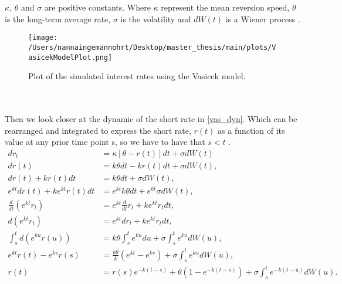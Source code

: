 $\kappa$, $\theta$ and $\sigma$ are positive constants. Where $\kappa$ represent the mean reversion speed, $\theta$ 
is the long-term average rate, $\sigma$ is the volatility  and $dW(t)$ is a Wiener process \cite{Bermudan}. 
\begin{figure}[h]
    \centering
    \texttt{[image: /Users/nannaingemannohrt/Desktop/master\_thesis/main/plots/VasicekModelPlot.png]}
    \caption{Plot of the simulated interest rates using the Vasicek model.}
    \label{fig:vasicek}
\end{figure}
\\\\
\noindent
Then we look closer at the dynamic of the short rate in \autoref{vas_dyn}. Which can be rearranged and integrated
to express the short rate, $r(t)$ as a function of its value at any prior time point s,
so we have to have that $s < t$ \cite{Bermudan}. 
\begin{align}
    d r_t &= \kappa \left[\theta - r(t)\right] dt + \sigma d W(t) \\
    d r(t) &= k \theta dt - k r(t) dt + \sigma d W(t), \\
    d r(t) + k r(t) dt &= k \theta dt + \sigma d W(t), \\
    e^{kt} d r(t) + k e^{kt} r(t) dt &= e^{kt} k \theta dt + e^{kt} \sigma d W(t), \\
    \frac{d}{dt} \left( e^{k t} r_t \right) &= e^{k t} \frac{d}{dt} r_t + k e^{k t} r_t dt, \\
    d\left( e^{k t} r_t \right) &= e^{k t} dr_t + k e^{k t} r_t dt, \\
    \int_s^t d \left( e^{ku} r(u) \right) &= k \theta \int_s^t e^{ku} du + \sigma \int_s^t e^{ku} d W(u), \\
    e^{kt} r(t) - e^{k s} r(s) &= \frac{k \theta}{k} \left( e^{kt} - e^{ks} \right) + \sigma \int_s^t e^{ku} d W(u), \\
    r(t) &= r(s) e^{-k(t-s)} + \theta \left( 1 - e^{-k(t-s)} \right) + \sigma \int_s^t e^{-k(t-u)} d W(u).
\end{align}
